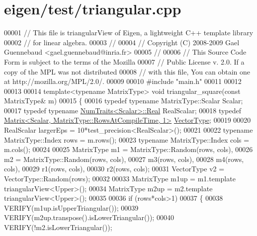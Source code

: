 \hypertarget{eigen_2test_2triangular_8cpp_source}{}\section{eigen/test/triangular.cpp}
\label{eigen_2test_2triangular_8cpp_source}

\begin{DoxyCode}
00001 \textcolor{comment}{// This file is triangularView of Eigen, a lightweight C++ template library}
00002 \textcolor{comment}{// for linear algebra.}
00003 \textcolor{comment}{//}
00004 \textcolor{comment}{// Copyright (C) 2008-2009 Gael Guennebaud <gael.guennebaud@inria.fr>}
00005 \textcolor{comment}{//}
00006 \textcolor{comment}{// This Source Code Form is subject to the terms of the Mozilla}
00007 \textcolor{comment}{// Public License v. 2.0. If a copy of the MPL was not distributed}
00008 \textcolor{comment}{// with this file, You can obtain one at http://mozilla.org/MPL/2.0/.}
00009 
00010 \textcolor{preprocessor}{#include "main.h"}
00011 
00012 
00013 
00014 \textcolor{keyword}{template}<\textcolor{keyword}{typename} MatrixType> \textcolor{keywordtype}{void} triangular\_square(\textcolor{keyword}{const} MatrixType& m)
00015 \{
00016   \textcolor{keyword}{typedef} \textcolor{keyword}{typename} MatrixType::Scalar Scalar;
00017   \textcolor{keyword}{typedef} \textcolor{keyword}{typename} \hyperlink{group___core___module_struct_eigen_1_1_num_traits}{NumTraits<Scalar>::Real} RealScalar;
00018   \textcolor{keyword}{typedef} \hyperlink{group___core___module_class_eigen_1_1_matrix}{Matrix<Scalar, MatrixType::RowsAtCompileTime, 1>} 
      \hyperlink{struct_vector_type}{VectorType};
00019 
00020   RealScalar largerEps = 10*test\_precision<RealScalar>();
00021 
00022   \textcolor{keyword}{typename} MatrixType::Index rows = m.rows();
00023   \textcolor{keyword}{typename} MatrixType::Index cols = m.cols();
00024 
00025   MatrixType m1 = MatrixType::Random(rows, cols),
00026              m2 = MatrixType::Random(rows, cols),
00027              m3(rows, cols),
00028              m4(rows, cols),
00029              r1(rows, cols),
00030              r2(rows, cols);
00031   VectorType v2 = VectorType::Random(rows);
00032 
00033   MatrixType m1up = m1.template triangularView<Upper>();
00034   MatrixType m2up = m2.template triangularView<Upper>();
00035 
00036   \textcolor{keywordflow}{if} (rows*cols>1)
00037   \{
00038     VERIFY(m1up.isUpperTriangular());
00039     VERIFY(m2up.transpose().isLowerTriangular());
00040     VERIFY(!m2.isLowerTriangular());

\end{DoxyCode}
